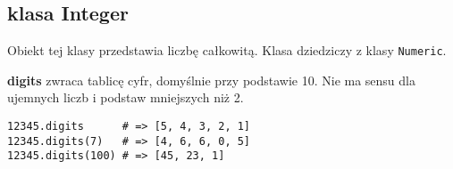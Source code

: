 \subsection{klasa Integer}
Obiekt tej klasy przedstawia liczbę całkowitą.
Klasa dziedziczy z klasy \texttt{Numeric}.




\textbf{digits} zwraca tablicę cyfr, domyślnie przy podstawie 10.
Nie ma sensu dla ujemnych liczb i podstaw mniejszych niż 2.
\begin{verbatim}
12345.digits      # => [5, 4, 3, 2, 1]
12345.digits(7)   # => [4, 6, 6, 0, 5]
12345.digits(100) # => [45, 23, 1]
\end{verbatim}


